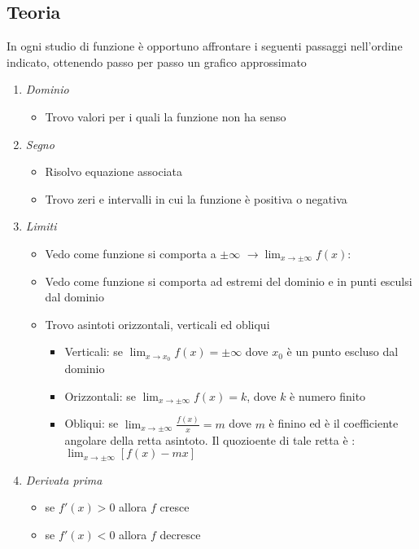 \subsection{Teoria}
In ogni studio di funzione è opportuno affrontare i seguenti passaggi nell'ordine indicato, ottenendo passo per passo un grafico approssimato
\begin{enumerate}
	\item \textit{Dominio}
	      \begin{itemize}
		      \item Trovo valori per i quali la funzione non ha senso
	      \end{itemize}
	\item \textit{Segno}
	      \begin{itemize}
		      \item Risolvo equazione associata
		      \item Trovo zeri e intervalli in cui la funzione è positiva o negativa
	      \end{itemize}
	\item \textit{Limiti}
	      \begin{itemize}
		      \item Vedo come funzione si comporta a $ \pm \infty $ $ \rightarrow \lim_{x \to \pm \infty} f(x) $:
		      \item Vedo come funzione si comporta ad estremi del dominio e in punti esculsi dal dominio
		      \item Trovo asintoti orizzontali, verticali ed obliqui
		            \begin{itemize}
			            \item Verticali: se $ \lim_{x \to x_0} f(x) = \pm \infty  $ dove $ x_0 $ è un punto escluso dal dominio
			            \item Orizzontali: se $ \lim_{x \to \pm\infty} f(x) = k $, dove $ k $ è numero finito
			            \item Obliqui: se $ \lim_{x \to \pm\infty} \frac{f(x)}{x} = m $ dove $ m $ è finino ed è il coefficiente angolare della retta asintoto. Il quozioente di tale retta è : $ \lim_{x \to \pm \infty} \left[f(x) - mx\right] $
		            \end{itemize}
	      \end{itemize}
	\item \textit{Derivata prima}
	      \begin{itemize}
		      \item se $ f'\left(x\right) > 0 $ allora $ f $ cresce
		      \item se $ f'\left(x\right) < 0 $ allora $ f $ decresce

\end{itemize}
\end{enumerate}
